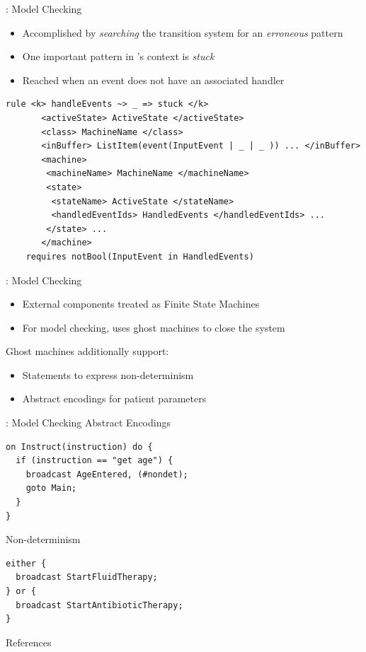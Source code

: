 \documentclass{beamer}
\begin{document}
\begin{frame}[fragile]{\MediK{}: Model Checking}
  \begin{itemize}
    \item Accomplished by \emph{searching} the transition system for
      an \emph{erroneous} pattern
    \item One important pattern in \MediK{}'s context is \emph{stuck}
    \item Reached when an event does not have an associated handler
  \end{itemize}
  \pause
  \begin{lstlisting}[language=medik,style=mediksty,basicstyle=\ttfamily\tiny]
  rule <k> handleEvents ~> _ => stuck </k>
       <activeState> ActiveState </activeState>
       <class> MachineName </class>
       <inBuffer> ListItem(event(InputEvent | _ | _ )) ... </inBuffer>
       <machine>
        <machineName> MachineName </machineName>
        <state>
         <stateName> ActiveState </stateName>
         <handledEventIds> HandledEvents </handledEventIds> ...
        </state> ...
       </machine>
    requires notBool(InputEvent in HandledEvents)
  \end{lstlisting}
\end{frame}
\begin{frame}{\MediK{}: Model Checking}
  \begin{itemize}
    \item External components treated as Finite State Machines
    \item For model checking, \MediK{} uses \alert{ghost machines}
      to close the system
  \end{itemize}
  Ghost machines additionally support:
  \begin{itemize}
    \item Statements to express \alert{non-determinism}
    \item Abstract encodings for patient parameters
  \end{itemize}
\end{frame}
\begin{frame}[fragile]{\MediK{}: Model Checking}
Abstract Encodings
  \begin{lstlisting}[language=medik,style=mediksty]
on Instruct(instruction) do {
  if (instruction == "get age") {
    broadcast AgeEntered, (#nondet);
    goto Main;
  }
}
\end{lstlisting}
\pause
Non-determinism
\begin{lstlisting}[language=medik,style=mediksty]
either {
  broadcast StartFluidTherapy;
} or {
  broadcast StartAntibioticTherapy;
}
\end{lstlisting}
\end{frame}
\begin{frame}[allowframebreaks]{References}
  
\end{frame}
\end{document}
